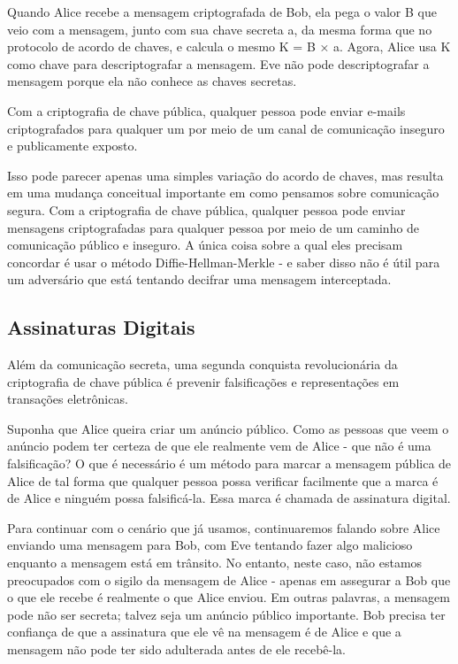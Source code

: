 \documentclass{book}
\begin{document}
Quando Alice recebe a mensagem criptografada de Bob, ela pega o valor B que veio com a mensagem, junto com sua chave secreta a, da mesma forma que no protocolo de acordo de chaves, e calcula o mesmo K = B × a. Agora, Alice usa K como chave para descriptografar a mensagem. Eve não pode descriptografar a mensagem porque ela não conhece as chaves secretas.

Com a criptografia de chave pública, qualquer pessoa pode enviar e-mails criptografados para qualquer um por meio de um canal de comunicação inseguro e publicamente exposto.

Isso pode parecer apenas uma simples variação do acordo de chaves, mas resulta em uma mudança conceitual importante em como pensamos sobre comunicação segura. Com a criptografia de chave pública, qualquer pessoa pode enviar mensagens criptografadas para qualquer pessoa por meio de um caminho de comunicação público e inseguro. A única coisa sobre a qual eles precisam concordar é usar o método Diffie-Hellman-Merkle - e saber disso não é útil para um adversário que está tentando decifrar uma mensagem interceptada.


\subsection{Assinaturas Digitais}
\label{}

Além da comunicação secreta, uma segunda conquista revolucionária da criptografia de chave pública é prevenir falsificações e representações em transações eletrônicas.

Suponha que Alice queira criar um anúncio público. Como as pessoas que veem o anúncio podem ter certeza de que ele realmente vem de Alice - que não é uma falsificação? O que é necessário é um método para marcar a mensagem pública de Alice de tal forma que qualquer pessoa possa verificar facilmente que a marca é de Alice e ninguém possa falsificá-la. Essa marca é chamada de assinatura digital.

Para continuar com o cenário que já usamos, continuaremos falando sobre Alice enviando uma mensagem para Bob, com Eve tentando fazer algo malicioso enquanto a mensagem está em trânsito. No entanto, neste caso, não estamos preocupados com o sigilo da mensagem de Alice - apenas em assegurar a Bob que o que ele recebe é realmente o que Alice enviou. Em outras palavras, a mensagem pode não ser secreta; talvez seja um anúncio público importante. Bob precisa ter confiança de que a assinatura que ele vê na mensagem é de Alice e que a mensagem não pode ter sido adulterada antes de ele recebê-la.
\end{document}
